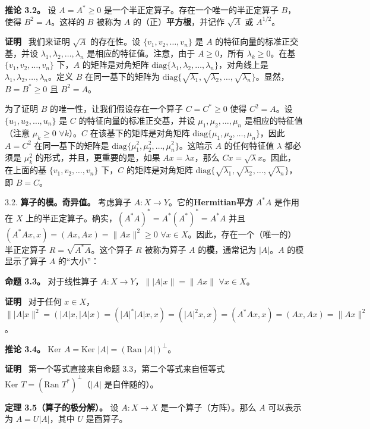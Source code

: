 \textbf{推论 3.2。} 设 $A = A^* \geq 0$ 是一个半正定算子。存在一个唯一的半正定算子 $B$，使得 $B^2 = A$。这样的 $B$ 被称为 $A$ 的（正）\textbf{平方根}，并记作 $\sqrt{A}$ 或 $A^{1/2}$。

\textbf{证明}~ 我们来证明 $\sqrt{A}$ 的存在性。设 $\{v_1, v_2, \dots, v_n\}$ 是 $A$ 的特征向量的标准正交基，并设 $\lambda_1, \lambda_2, \dots, \lambda_n$ 是相应的特征值。注意，由于 $A \geq 0$，所有 $\lambda_k \geq 0$。在基 $\{v_1, v_2, \dots, v_n\}$ 下，$A$ 的矩阵是对角矩阵 $\text{diag}\{\lambda_1, \lambda_2, \dots, \lambda_n\}$，对角线上是 $\lambda_1, \lambda_2, \dots, \lambda_n$。定义 $B$ 在同一基下的矩阵为 $\text{diag}\{\sqrt{\lambda_1}, \sqrt{\lambda_2}, \dots, \sqrt{\lambda_n}\}$。显然，$B = B^* \geq 0$ 且 $B^2 = A$。

为了证明 $B$ 的唯一性，让我们假设存在一个算子 $C = C^* \geq 0$ 使得 $C^2 = A$。设 $\{u_1, u_2, \dots, u_n\}$ 是 $C$ 的特征向量的标准正交基，并设 $\mu_1, \mu_2, \dots, \mu_n$ 是相应的特征值（注意 $\mu_k \geq 0$ $\forall k$）。$C$ 在该基下的矩阵是对角矩阵 $\text{diag}\{\mu_1, \mu_2, \dots, \mu_n\}$，因此 $A = C^2$ 在同一基下的矩阵是 $\text{diag}\{\mu_1^2, \mu_2^2, \dots, \mu_n^2\}$。这暗示 $A$ 的任何特征值 $\lambda$ 都必须是 $\mu_k^2$ 的形式，并且，更重要的是，如果 $Ax = \lambda x$，那么 $Cx = \sqrt{\lambda} x$。因此，在上面的基 $\{v_1, v_2, \dots, v_n\}$ 下，$C$ 的矩阵是对角矩阵 $\text{diag}\{\sqrt{\lambda_1}, \sqrt{\lambda_2}, \dots, \sqrt{\lambda_n}\}$，即 $B = C$。

3.2. \textbf{算子的模。奇异值。} 考虑算子 $A: X \to Y$。它的\textbf{Hermitian平方} $A^*A$ 是作用在 $X$ 上的半正定算子。确实，$(A^*A)^* = A^*(A^*)^* = A^*A$ 并且 $(A^*Ax, x) = (Ax, Ax) = \|Ax\|^2 \geq 0$ $\forall x \in X$。因此，存在一个（唯一的）半正定算子 $R = \sqrt{A^*A}$。这个算子 $R$ 被称为算子 $A$ 的\textbf{模}，通常记为 $|A|$。$A$ 的模显示了算子 $A$ 的“大小”：

\textbf{命题 3.3。} 对于线性算子 $A: X \to Y$，$\| |A| x \| = \|Ax\|$ $\forall x \in X$。

\textbf{证明}~ 对于任何 $x \in X$，$\| |A| x \|^2 = (|A|x, |A|x) = (|A|^*|A|x, x) = ( |A|^2 x, x ) = (A^*Ax, x) = (Ax, Ax) = \|Ax\|^2$。

\textbf{推论 3.4。} $\text{Ker } A = \text{Ker } |A| = (\text{Ran } |A|)^\perp$。

\textbf{证明}~ 第一个等式直接来自命题 3.3，第二个等式来自恒等式 $\text{Ker } T = (\text{Ran } T^*)^\perp$（$|A|$ 是自伴随的）。

\textbf{定理 3.5（算子的极分解）。} 设 $A: X \to X$ 是一个算子（方阵）。那么 $A$ 可以表示为 $A = U|A|$，其中 $U$ 是酉算子。

